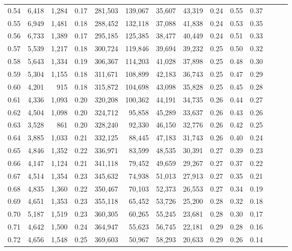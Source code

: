 \begin{tabular}{rrrrrrrrrrrrrr}
0.54 &  6,418 &  1,284 &  0.17 &  281,503 &  139,067 &  35,607 &  43,319 &  0.24 &  0.55 &      0.37 \\
0.55 &  6,949 &  1,481 &  0.18 &  288,452 &  132,118 &  37,088 &  41,838 &  0.24 &  0.53 &      0.35 \\
0.56 &  6,733 &  1,389 &  0.17 &  295,185 &  125,385 &  38,477 &  40,449 &  0.24 &  0.51 &      0.33 \\
0.57 &  5,539 &  1,217 &  0.18 &  300,724 &  119,846 &  39,694 &  39,232 &  0.25 &  0.50 &      0.32 \\
0.58 &  5,643 &  1,334 &  0.19 &  306,367 &  114,203 &  41,028 &  37,898 &  0.25 &  0.48 &      0.30 \\
0.59 &  5,304 &  1,155 &  0.18 &  311,671 &  108,899 &  42,183 &  36,743 &  0.25 &  0.47 &      0.29 \\
0.60 &  4,201 &    915 &  0.18 &  315,872 &  104,698 &  43,098 &  35,828 &  0.25 &  0.45 &      0.28 \\
0.61 &  4,336 &  1,093 &  0.20 &  320,208 &  100,362 &  44,191 &  34,735 &  0.26 &  0.44 &      0.27 \\
0.62 &  4,504 &  1,098 &  0.20 &  324,712 &   95,858 &  45,289 &  33,637 &  0.26 &  0.43 &      0.26 \\
0.63 &  3,528 &    861 &  0.20 &  328,240 &   92,330 &  46,150 &  32,776 &  0.26 &  0.42 &      0.25 \\
0.64 &  3,885 &  1,033 &  0.21 &  332,125 &   88,445 &  47,183 &  31,743 &  0.26 &  0.40 &      0.24 \\
0.65 &  4,846 &  1,352 &  0.22 &  336,971 &   83,599 &  48,535 &  30,391 &  0.27 &  0.39 &      0.23 \\
0.66 &  4,147 &  1,124 &  0.21 &  341,118 &   79,452 &  49,659 &  29,267 &  0.27 &  0.37 &      0.22 \\
0.67 &  4,514 &  1,354 &  0.23 &  345,632 &   74,938 &  51,013 &  27,913 &  0.27 &  0.35 &      0.21 \\
0.68 &  4,835 &  1,360 &  0.22 &  350,467 &   70,103 &  52,373 &  26,553 &  0.27 &  0.34 &      0.19 \\
0.69 &  4,651 &  1,353 &  0.23 &  355,118 &   65,452 &  53,726 &  25,200 &  0.28 &  0.32 &      0.18 \\
0.70 &  5,187 &  1,519 &  0.23 &  360,305 &   60,265 &  55,245 &  23,681 &  0.28 &  0.30 &      0.17 \\
0.71 &  4,642 &  1,500 &  0.24 &  364,947 &   55,623 &  56,745 &  22,181 &  0.29 &  0.28 &      0.16 \\
0.72 &  4,656 &  1,548 &  0.25 &  369,603 &   50,967 &  58,293 &  20,633 &  0.29 &  0.26 &      0.14 \\

\end{tabular}
